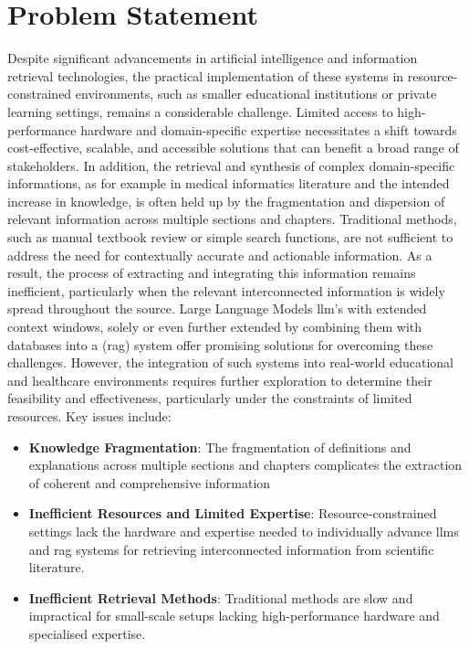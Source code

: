 \section{Problem Statement}
Despite significant advancements in artificial intelligence and information retrieval technologies, the practical implementation of these systems in resource-constrained environments, such as smaller educational institutions or private learning settings, remains a considerable challenge. 
Limited access to high-performance hardware and domain-specific expertise necessitates a shift towards cost-effective, scalable, and accessible solutions that can benefit a broad range of stakeholders.
%
In addition, the retrieval and synthesis of complex domain-specific informations, as for example in medical informatics literature and the intended increase in knowledge, is often held up by the fragmentation and dispersion of relevant information across multiple sections and chapters. 
Traditional methods, such as manual textbook review or simple search functions, are not sufficient to address the need for contextually accurate and actionable information. 
As a result, the process of extracting and integrating this information remains inefficient, particularly when the relevant interconnected information is widely spread throughout the source.
%
Large Language Models \ac{llm}'s with extended context windows, solely or even further extended by combining them with databases into a (\ac{rag}) system offer promising solutions for overcoming these challenges. 
However, the integration of such systems into real-world educational and healthcare environments requires further exploration to determine their feasibility and effectiveness, particularly under the constraints of limited resources.
%
Key issues include:
\begin{itemize}
    \item \textbf{Knowledge Fragmentation}: 
    The fragmentation of definitions and explanations across multiple sections and chapters complicates the extraction of coherent and comprehensive information 
    \item \textbf{Inefficient Resources and Limited Expertise}: 
    Resource-constrained settings lack the hardware and expertise needed to individually advance \ac{llm}s and \ac{rag} systems for retrieving interconnected information from scientific literature.
    
    \item \textbf{Inefficient Retrieval Methods}: Traditional methods are slow and impractical for small-scale setups lacking high-performance hardware and specialised expertise.
\end{itemize}

